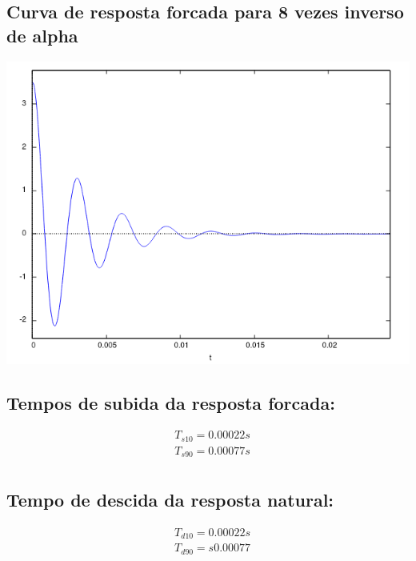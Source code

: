 \documentclass[12pt,twoside, a4paper, twocolumn]{article}
\begin{document}
\subsection{Curva de resposta forcada para 8 vezes inverso de alpha}

\begin{adjustbox}{scale=0.55}
    \includegraphics{Figure_4.png}
\end{adjustbox}

\subsection{Tempos de subida da resposta forcada:}

\begin{equation*}
    \begin{align*}
         & T_{s10} = 0.00022s \\
         & T_{s90} = 0.00077s \\
    \end{align*}
\end{equation*}

\subsection{Tempo de descida da resposta natural:}

\begin{equation*}
    \begin{align*}
         & T_{d10} =  0.00022s  \\
         & T_{d90} = s  0.00077 \\
    \end{align*}
\end{equation*}
\end{document}

